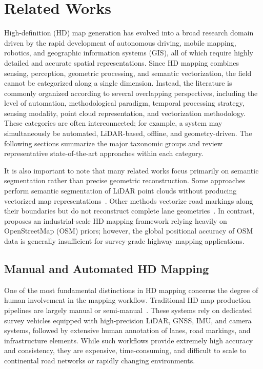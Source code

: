 \chapter{Related Works}
\label{ch:lit}

High-definition (HD) map generation has evolved into a broad research domain driven by the rapid development of autonomous driving, mobile mapping, robotics, and geographic information systems (GIS), all of which require highly detailed and accurate spatial representations. Since HD mapping combines sensing, perception, geometric processing, and semantic vectorization, the field cannot be categorized along a single dimension. Instead, the literature is commonly organized according to several overlapping perspectives, including the level of automation, methodological paradigm, temporal processing strategy, sensing modality, point cloud representation, and vectorization methodology. These categories are often interconnected; for example, a system may simultaneously be automated, LiDAR-based, offline, and geometry-driven. The following sections summarize the major taxonomic groups and review representative state-of-the-art approaches within each category.

It is also important to note that many related works focus primarily on semantic segmentation rather than precise geometric reconstruction. Some approaches perform semantic segmentation of LiDAR point clouds without producing vectorized map representations~\cite{ExtractionClassificationRoadMarkings}. Other methods vectorize road markings along their boundaries but do not reconstruct complete lane geometries~\cite{isprs-archives-XLII-2-W13-1089-2019}. In contrast,~\cite{Eisemann_2024} proposes an industrial-scale HD mapping framework relying heavily on OpenStreetMap (OSM) priors; however, the global positional accuracy of OSM data is generally insufficient for survey-grade highway mapping applications.

\section{Manual and Automated HD Mapping}
\label{sec:manual_automated}

One of the most fundamental distinctions in HD mapping concerns the degree of human involvement in the mapping workflow. Traditional HD map production pipelines are largely manual or semi-manual~\cite{rong2020lgsvlsimulatorhighfidelity}. These systems rely on dedicated survey vehicles equipped with high-precision LiDAR, GNSS, IMU, and camera systems, followed by extensive human annotation of lanes, road markings, and infrastructure elements. While such workflows provide extremely high accuracy and consistency, they are expensive, time-consuming, and difficult to scale to continental road networks or rapidly changing environments.

